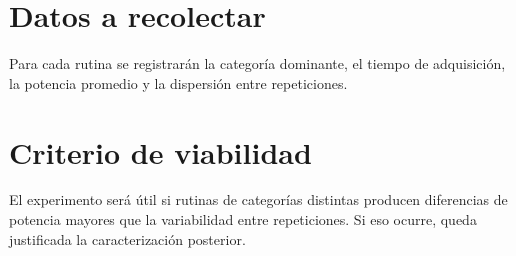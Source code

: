 \section{Datos a recolectar}
\label{sec:datos_experimento}

Para cada rutina se registrarán la categoría dominante, el tiempo de adquisición, la potencia promedio y la dispersión entre repeticiones.

\section{Criterio de viabilidad}
\label{sec:criterio_viabilidad}

El experimento será útil si rutinas de categorías distintas producen diferencias de potencia mayores que la variabilidad entre repeticiones. Si eso ocurre, queda justificada la caracterización posterior.

